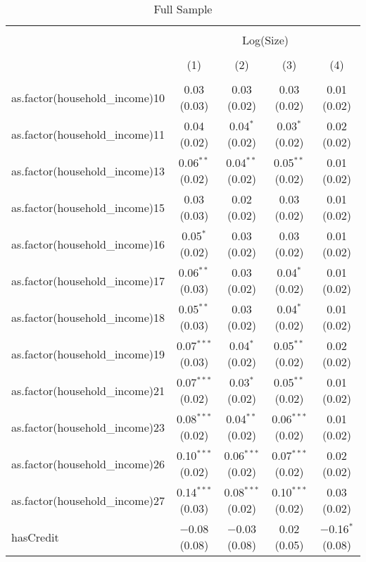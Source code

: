 
\begin{table}[!htbp] \centering 
  \caption{Full Sample} 
  \label{tab:packageSizeFullTamponLiqAppendix} 
\begin{tabular}{@{\extracolsep{5pt}}lcccc} 
\\[-1.8ex]\hline 
\hline \\[-1.8ex] 
 & \multicolumn{4}{c}{Log(Size)} \\ 
\\[-1.8ex] & (1) & (2) & (3) & (4)\\ 
\hline \\[-1.8ex] 
 as.factor(household\_income)10 & 0.03 (0.03) & 0.03 (0.02) & 0.03 (0.02) & 0.01 (0.02) \\ 
  as.factor(household\_income)11 & 0.04 (0.02) & 0.04$^{*}$ (0.02) & 0.03$^{*}$ (0.02) & 0.02 (0.02) \\ 
  as.factor(household\_income)13 & 0.06$^{**}$ (0.02) & 0.04$^{**}$ (0.02) & 0.05$^{**}$ (0.02) & 0.01 (0.02) \\ 
  as.factor(household\_income)15 & 0.03 (0.03) & 0.02 (0.02) & 0.03 (0.02) & 0.01 (0.02) \\ 
  as.factor(household\_income)16 & 0.05$^{*}$ (0.02) & 0.03 (0.02) & 0.03 (0.02) & 0.01 (0.02) \\ 
  as.factor(household\_income)17 & 0.06$^{**}$ (0.03) & 0.03 (0.02) & 0.04$^{*}$ (0.02) & 0.01 (0.02) \\ 
  as.factor(household\_income)18 & 0.05$^{**}$ (0.03) & 0.03 (0.02) & 0.04$^{*}$ (0.02) & 0.01 (0.02) \\ 
  as.factor(household\_income)19 & 0.07$^{***}$ (0.03) & 0.04$^{*}$ (0.02) & 0.05$^{**}$ (0.02) & 0.02 (0.02) \\ 
  as.factor(household\_income)21 & 0.07$^{***}$ (0.02) & 0.03$^{*}$ (0.02) & 0.05$^{**}$ (0.02) & 0.01 (0.02) \\ 
  as.factor(household\_income)23 & 0.08$^{***}$ (0.02) & 0.04$^{**}$ (0.02) & 0.06$^{***}$ (0.02) & 0.01 (0.02) \\ 
  as.factor(household\_income)26 & 0.10$^{***}$ (0.02) & 0.06$^{***}$ (0.02) & 0.07$^{***}$ (0.02) & 0.02 (0.02) \\ 
  as.factor(household\_income)27 & 0.14$^{***}$ (0.03) & 0.08$^{***}$ (0.02) & 0.10$^{***}$ (0.02) & 0.03 (0.02) \\ 
  hasCredit & $-$0.08 (0.08) & $-$0.03 (0.08) & 0.02 (0.05) & $-$0.16$^{*}$ (0.08) \\ 

\end{tabular}
\end{table}
